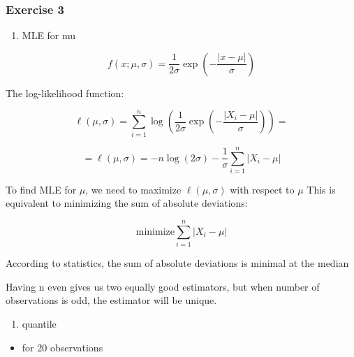 \documentclass[
]{article}
\providecommand{\tightlist}{%
  \setlength{\itemsep}{0pt}\setlength{\parskip}{0pt}}
\begin{document}
\subsubsection{Exercise 3}\label{exercise-3}

\begin{enumerate}
\def\labelenumi{\alph{enumi}.}
\tightlist
\item
  MLE for mu
\end{enumerate}

\[
f(x; \mu, \sigma) = \frac{1}{2\sigma} \exp \left( -\frac{|x - \mu|}{\sigma} \right)
\]

The log-likelihood function:

\[
\ell(\mu, \sigma) = \sum_{i=1}^n \log \left( \frac{1}{2\sigma} \exp \left( -\frac{|X_i - \mu|}{\sigma} \right) \right) =
\]

\[
= \ell(\mu, \sigma) = -n \log(2\sigma) - \frac{1}{\sigma} \sum_{i=1}^n |X_i - \mu|
\]

To find MLE for \(\mu\), we need to maximize \(\ell(\mu, \sigma)\) with
respect to \(\mu\) This is equivalent to minimizing the sum of absolute
deviations:

\[
\text{minimize} \sum_{i=1}^n |X_i - \mu|
\]

According to statistics, the sum of absolute deviations is minimal at
the median

Having n even gives us two equally good estimators, but when number of
observations is odd, the estimator will be unique.

\begin{enumerate}
\def\labelenumi{\alph{enumi}.}
\setcounter{enumi}{1}
\tightlist
\item
  quantile
\end{enumerate}

\begin{itemize}
\tightlist
\item
  for 20 observations
\end{itemize}
\end{document}
